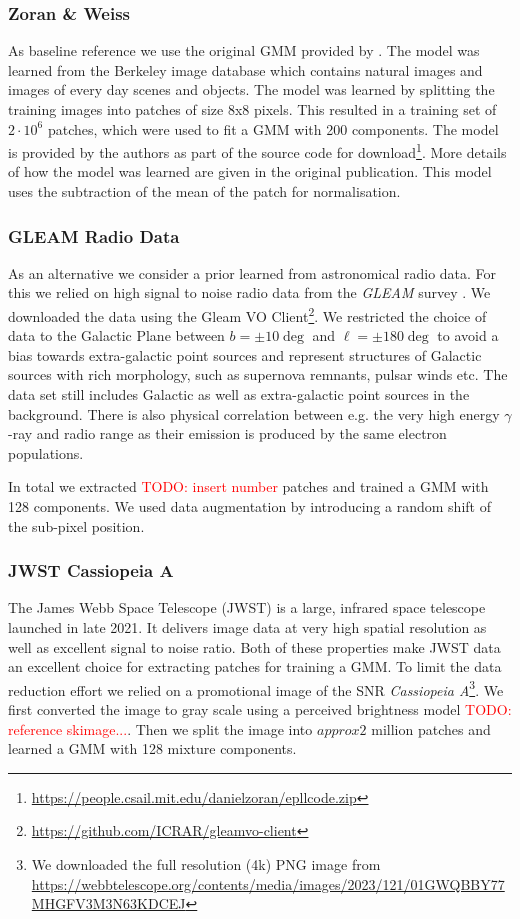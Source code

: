 \documentclass[twocolumn]{aastex631}
\newcommand{\gammaray}{$\gamma$-ray\xspace}
\newcommand{\todo}[1]{\textcolor{red}{TODO: #1}\PackageWarning{TODO:}{#1!}}
\begin{document}
    \subsubsection{Zoran \& Weiss}
    As baseline reference we use the original GMM provided by \cite{Zoran2011}. The model was learned from the Berkeley image database \citep{Martin2001} which contains natural images and images of every day scenes and objects. The model was learned by splitting the training images into patches of size 8x8 pixels. This resulted in a training set of $2 \cdot 10^{6}$ patches, which were used to fit a GMM with 200 components. The model is provided by the authors as part of the source code for download\footnote{\url{https://people.csail.mit.edu/danielzoran/epllcode.zip}}. More details of how the model was learned are given in the original publication. This model uses the subtraction of the mean of the patch for normalisation.
    
    \subsubsection{GLEAM Radio Data}
    \label{sssec:gleam-radio-data}
    As an alternative we consider a prior learned from astronomical radio data. For this we relied on high signal to noise radio data from the \textit{GLEAM} survey \cite{HurleyWalker2022}. We downloaded the data using the Gleam VO Client\footnote{\url{https://github.com/ICRAR/gleamvo-client}}. We restricted the choice of data to the Galactic Plane between $b=\pm10\deg$ and $\ell = \pm180\deg$ to avoid a bias towards extra-galactic point sources and represent structures of Galactic sources with rich morphology, such as supernova remnants, pulsar winds etc. The data set still includes Galactic as well as extra-galactic point sources in the background. There is also physical correlation between e.g. the very high energy \gammaray and radio range as their emission is produced by the same electron populations.

    In total we extracted \todo{insert number} patches and trained a GMM with 128 components. We used data augmentation by introducing a random shift of the sub-pixel position.

    \subsubsection{JWST Cassiopeia A}
    The James Webb Space Telescope (JWST) is a large, infrared space telescope launched in late 2021. It delivers image data at very high spatial resolution as well as excellent signal to noise ratio. Both of these properties make JWST data an excellent choice for extracting patches for training a GMM. To limit the data reduction effort we relied on a promotional image of the SNR \textit{Cassiopeia A}\footnote{We downloaded the full resolution (4k)  PNG image from \url{https://webbtelescope.org/contents/media/images/2023/121/01GWQBBY77MHGFV3M3N63KDCEJ}}.
    We first converted the image to gray scale using a perceived brightness model \todo{reference skimage...}. Then we split the image into $approx 2$ million patches and learned a GMM with 128 mixture components.
    
\end{document}

